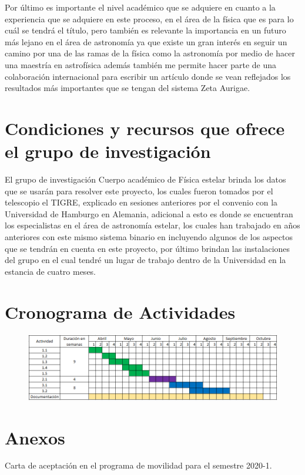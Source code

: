 \documentclass[11pt]{article}
\begin{document}
Por último es importante el nivel académico que se adquiere en cuanto a la experiencia que se adquiere en este proceso, en el área de la física que es para lo cuál se tendrá el título, pero también es relevante la importancia en un futuro más lejano en el área de astronomía ya que existe un gran  interés en seguir un camino por una de las ramas de la física como la astronomía por medio de hacer una maestría en astrofísica además también me permite hacer parte de una colaboración internacional para escribir un artículo donde se vean reflejados los resultados más importantes que se tengan del sistema Zeta Aurigae.




\section{Condiciones y recursos que ofrece el grupo de investigación}
El grupo de investigación Cuerpo académico de Física estelar brinda los datos que se usarán para resolver este proyecto, los cuales fueron tomados por el telescopio el TIGRE, explicado en sesiones anteriores por el convenio con la Universidad de Hamburgo en Alemania, adicional a esto es donde se encuentran los especialistas en el área de astronomía estelar, los cuales han trabajado en años anteriores con este mismo sistema binario en incluyendo algunos de los aspectos que se tendrán en cuenta en este proyecto, por último brindan las instalaciones del grupo en el cual tendré un lugar de trabajo dentro de la Universidad en la estancia de cuatro meses.
\section{Cronograma de Actividades}	

\begin{figure}[h]
    \centering
    \includegraphics[width=1\linewidth]{Cronograma.PNG}
\label{Cronograma}
\end{figure}





\section{Anexos}

Carta de aceptación en el programa de movilidad para el semestre 2020-1.

\end{document}
